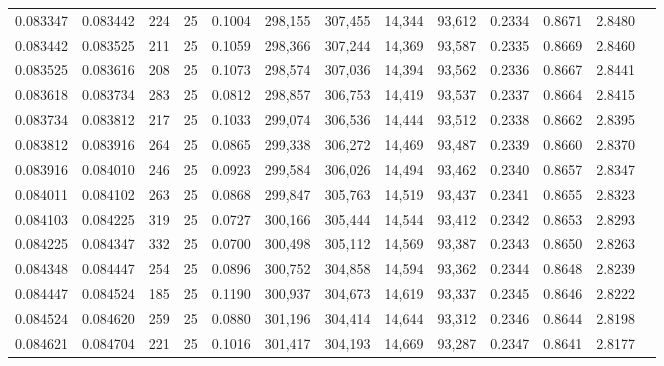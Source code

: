 \begin{tabular}{rrrrrrrrrrrrr}
0.083347 & 0.083442 &   224 &  25 &                                     0.1004 & 298,155 & 307,455 &  14,344 &  93,612 & 0.2334 & 0.8671 & 2.8480 \\
0.083442 & 0.083525 &   211 &  25 &                                     0.1059 & 298,366 & 307,244 &  14,369 &  93,587 & 0.2335 & 0.8669 & 2.8460 \\
0.083525 & 0.083616 &   208 &  25 &                                     0.1073 & 298,574 & 307,036 &  14,394 &  93,562 & 0.2336 & 0.8667 & 2.8441 \\
0.083618 & 0.083734 &   283 &  25 &                                     0.0812 & 298,857 & 306,753 &  14,419 &  93,537 & 0.2337 & 0.8664 & 2.8415 \\
0.083734 & 0.083812 &   217 &  25 &                                     0.1033 & 299,074 & 306,536 &  14,444 &  93,512 & 0.2338 & 0.8662 & 2.8395 \\
0.083812 & 0.083916 &   264 &  25 &                                     0.0865 & 299,338 & 306,272 &  14,469 &  93,487 & 0.2339 & 0.8660 & 2.8370 \\
0.083916 & 0.084010 &   246 &  25 &                                     0.0923 & 299,584 & 306,026 &  14,494 &  93,462 & 0.2340 & 0.8657 & 2.8347 \\
0.084011 & 0.084102 &   263 &  25 &                                     0.0868 & 299,847 & 305,763 &  14,519 &  93,437 & 0.2341 & 0.8655 & 2.8323 \\
0.084103 & 0.084225 &   319 &  25 &                                     0.0727 & 300,166 & 305,444 &  14,544 &  93,412 & 0.2342 & 0.8653 & 2.8293 \\
0.084225 & 0.084347 &   332 &  25 &                                     0.0700 & 300,498 & 305,112 &  14,569 &  93,387 & 0.2343 & 0.8650 & 2.8263 \\
0.084348 & 0.084447 &   254 &  25 &                                     0.0896 & 300,752 & 304,858 &  14,594 &  93,362 & 0.2344 & 0.8648 & 2.8239 \\
0.084447 & 0.084524 &   185 &  25 &                                     0.1190 & 300,937 & 304,673 &  14,619 &  93,337 & 0.2345 & 0.8646 & 2.8222 \\
0.084524 & 0.084620 &   259 &  25 &                                     0.0880 & 301,196 & 304,414 &  14,644 &  93,312 & 0.2346 & 0.8644 & 2.8198 \\
0.084621 & 0.084704 &   221 &  25 &                                     0.1016 & 301,417 & 304,193 &  14,669 &  93,287 & 0.2347 & 0.8641 & 2.8177 \\

\end{tabular}
